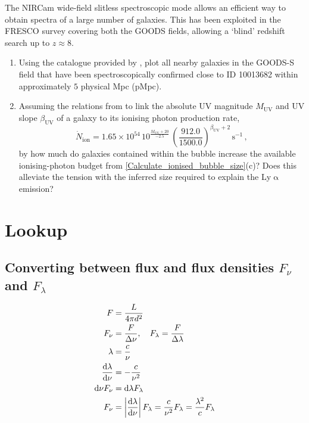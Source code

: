\documentclass{article}
\newcommand{\Lya}{{Ly\ensuremath{\upalpha}}\xspace}
\theoremstyle{definition}
\begin{document}
The NIRCam wide-field slitless spectroscopic mode allows an efficient way to obtain spectra of a large number of galaxies. This has been exploited in the FRESCO survey \citep{2023MNRAS.525.2864O} covering both the GOODS fields, allowing a `blind' redshift search up to $z \approx 8$.
\begin{enumerate}[label=(\alph*)]
    \item Using the catalogue provided by \citet{2024ApJ...974...41H}, plot all nearby galaxies in the GOODS-S field that have been spectroscopically confirmed close to ID 10013682 within approximately $5$ physical Mpc (pMpc).
    \item Assuming the relations from \citet{2020MNRAS.499.1395M} to link the absolute UV magnitude $M_\text{UV}$ and UV slope $\beta_\text{UV}$ of a galaxy to its ionising photon production rate,
    \begin{equation*}
        \dot{N}_\text{ion} = 1.65 \times 10^{54} \, 10^{\frac{M_\text{UV}+20}{-2.5}} \, \left( \frac{912.0}{1500.0} \right)^{\beta_\text{UV} + 2} \, \mathrm{s^{-1}} \, ,
    \end{equation*}
    by how much do galaxies contained within the bubble increase the available ionising-photon budget from \cref{Calculate_ionised_bubble_size}(c)? Does this alleviate the tension with the inferred size required to explain the \Lya emission?
\end{enumerate}



\appendix

\section{Lookup}

\subsection{Converting between flux and flux densities $F_\nu$ and $F_\lambda$}
\label{app:Flux_conversions}

\begin{align*}
    F & = \frac{L}{4 \pi d^2}
    \\
    F_\nu & = \frac{F}{\Delta \nu}, \quad F_\lambda = \frac{F}{\Delta \lambda}
    \\
    \lambda & = \frac{c}{\nu}
    \\
    \frac{\dif \lambda}{\dif \nu} & = - \frac{c}{\nu^2}
    \\
    \dif \nu F_\nu & = \dif \lambda F_\lambda
    \\
    F_\nu & = \left| \frac{\dif \lambda}{\dif \nu} \right| F_\lambda = \frac{c}{\nu^2} F_\lambda = \frac{\lambda^2}{c} F_\lambda
\end{align*}
\end{document}
